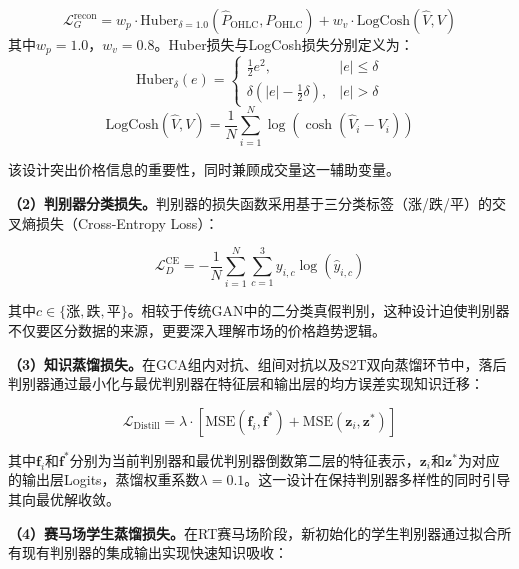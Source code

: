 \begin{equation}
\mathcal{L}_{G}^{\text{recon}} = w_p \cdot \text{Huber}_{\delta=1.0}(\hat{P}_{\text{OHLC}}, P_{\text{OHLC}}) + w_v \cdot \text{LogCosh}(\hat{V}, V)
\label{eq:financial_aware_loss}
\end{equation}
其中$w_p=1.0$，$w_v=0.8$。Huber损失与LogCosh损失分别定义为：
\begin{equation}
\text{Huber}_\delta(e) = \begin{cases} \frac{1}{2}e^2, & |e| \leq \delta \\ \delta\left(|e| - \frac{1}{2}\delta\right), & |e| > \delta \end{cases}
\end{equation}
\begin{equation}
\text{LogCosh}(\hat{V}, V) = \frac{1}{N}\sum_{i=1}^{N}\log\left(\cosh(\hat{V}_i - V_i)\right)
\end{equation}

该设计突出价格信息的重要性，同时兼顾成交量这一辅助变量。

\textbf{（2）判别器分类损失。}判别器的损失函数采用基于三分类标签（涨/跌/平）的交叉熵损失（Cross-Entropy Loss）：

\begin{equation}
\mathcal{L}_{D}^{\text{CE}} = -\frac{1}{N}\sum_{i=1}^{N}\sum_{c=1}^{3} y_{i,c} \log(\hat{y}_{i,c})
\label{eq:disc_ce_loss}
\end{equation}

其中$c \in \{\text{涨}, \text{跌}, \text{平}\}$。相较于传统GAN中的二分类真假判别，这种设计迫使判别器不仅要区分数据的来源，更要深入理解市场的价格趋势逻辑。

\textbf{（3）知识蒸馏损失。}在GCA组内对抗、组间对抗以及S2T双向蒸馏环节中，落后判别器通过最小化与最优判别器在特征层和输出层的均方误差实现知识迁移：

\begin{equation}
\mathcal{L}_{\text{Distill}} = \lambda \cdot \left[\text{MSE}(\mathbf{f}_i, \mathbf{f}^*) + \text{MSE}(\mathbf{z}_i, \mathbf{z}^*)\right]
\label{eq:distill_loss}
\end{equation}

其中$\mathbf{f}_i$和$\mathbf{f}^*$分别为当前判别器和最优判别器倒数第二层的特征表示，$\mathbf{z}_i$和$\mathbf{z}^*$为对应的输出层Logits，蒸馏权重系数$\lambda=0.1$。这一设计在保持判别器多样性的同时引导其向最优解收敛。

\textbf{（4）赛马场学生蒸馏损失。}在RT赛马场阶段，新初始化的学生判别器通过拟合所有现有判别器的集成输出实现快速知识吸收：

